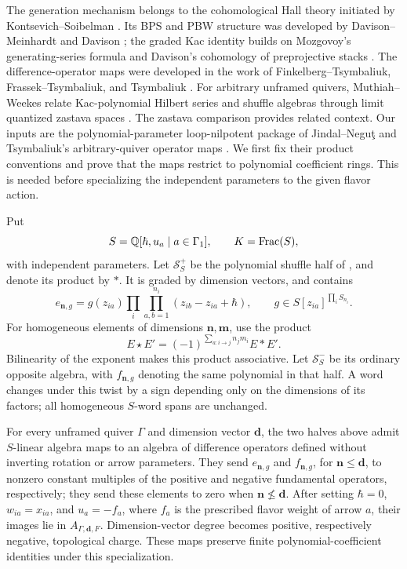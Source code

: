The generation mechanism belongs to the cohomological Hall theory
initiated by Kontsevich--Soibelman \cite{KontsevichSoibelman11}.
Its BPS and PBW structure was developed by Davison--Meinhardt and
Davison \cite{DavisonMeinhardt20,Davison25AffineBPS}; the graded Kac
identity builds on Mozgovoy's generating-series formula and Davison's
cohomology of preprojective stacks
\cite{Mozgovoy11McKay,Davison23Preprojective}.
The difference-operator maps were developed in the work of
Finkelberg--Tsymbaliuk, Frassek--Tsymbaliuk, and Tsymbaliuk
\cite{FinkelbergTsymbaliuk19Integral,FrassekTsymbaliuk22,Tsymbaliuk23Difference}.
For arbitrary unframed quivers, Muthiah--Weekes relate Kac-polynomial
Hilbert series and shuffle algebras through limit quantized zastava
spaces \cite{MuthiahWeekes2026Zastavas}.
The zastava comparison provides related context.  Our inputs are the
polynomial-parameter loop-nilpotent package of Jindal--Negu\c{t}
\cite{JindalNegut26} and Tsymbaliuk's arbitrary-quiver operator maps
\cite[Theorem~5.7]{Tsymbaliuk23Difference}.
We first fix their product conventions and prove that the maps restrict
to polynomial coefficient rings.  This is needed before specializing
the independent parameters to the given flavor action.

Put
\[
 S=\mathbb Q[\hbar,u_a\mid a\in\Gamma_1],
 \qquad K=\operatorname{Frac}(S),
\]
with independent parameters.  Let \(\mathcal S_S^+\) be the polynomial
shuffle half of \cite[Definition~2.3]{JindalNegut26}, and denote its
product by \(*\).  It is graded by dimension vectors, and contains
\[
 e_{\mathbf n,g}
   =g(z_{ia})\prod_i\prod_{a,b=1}^{n_i}
                   (z_{ib}-z_{ia}+\hbar),
 \qquad
 g\in S[z_{ia}]^{\prod_iS_{n_i}}.
\]
For homogeneous elements of dimensions \(\mathbf n,\mathbf m\), use
the product
\begin{equation}\label{eq:hall-sign-product}
 E\star E'
   =(-1)^{\sum_{a:i\to j}n_jm_i}E*E'.
\end{equation}
Bilinearity of the exponent makes this product associative.
Let \(\mathcal S_S^-\) be its ordinary opposite algebra, with
\(f_{\mathbf n,g}\) denoting the same polynomial in that half.
A word changes under this twist by a sign depending only on the
dimensions of its factors; all homogeneous \(S\)-word spans are unchanged.

\begin{lemma}\label{lem:polynomial-monopole-maps}
For every unframed quiver \(\Gamma\) and dimension vector \(\mathbf d\),
the two halves above admit \(S\)-linear algebra maps to an algebra of
difference operators defined without inverting rotation or arrow parameters.
They send \(e_{\mathbf n,g}\) and \(f_{\mathbf n,g}\), for
\(\mathbf n\leq\mathbf d\), to nonzero constant multiples of the
positive and negative fundamental operators, respectively; they send
these elements to zero when \(\mathbf n\not\leq\mathbf d\).
After setting \(\hbar=0\), \(w_{ia}=x_{ia}\), and
\(u_a=-f_a\), where \(f_a\) is the prescribed flavor weight of arrow
\(a\), their images lie in \(A_{\Gamma,\mathbf d,F}\).
Dimension-vector degree becomes positive, respectively negative,
topological charge.  These maps preserve finite polynomial-coefficient
identities under this specialization.
\end{lemma}

